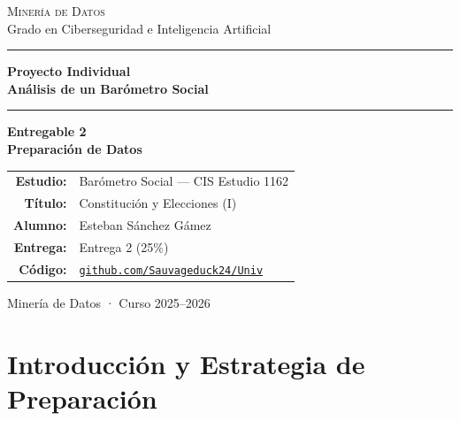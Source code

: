 \documentclass[12pt,a4paper]{article}
\begin{document}
\begin{titlepage}
  \centering
  \vspace*{2cm}

  {\large\color{gray}\textsc{Minería de Datos}\\
  Grado en Ciberseguridad e Inteligencia Artificial}

  \vspace{1.5cm}
  {\color{primary}\rule{\linewidth}{1.5pt}}
  \vspace{0.4cm}

  {\Huge\bfseries\color{black} Proyecto Individual\\[0.3em]
  \Large Análisis de un Barómetro Social}

  \vspace{0.4cm}
  {\color{primary}\rule{\linewidth}{1.5pt}}

  \vspace{1cm}
  {\LARGE\bfseries\color{black}
  Entregable 2\\[0.2em]
  \large Preparación de Datos}

  \vspace{2cm}
  \begin{tabular}{rl}
    \textbf{Estudio:}    & Barómetro Social --- CIS Estudio 1162 \\[4pt]
    \textbf{Título:}     & Constitución y Elecciones (I) \\[4pt]
    \textbf{Alumno:}     & Esteban Sánchez Gámez \\[4pt]
    \textbf{Entrega:}    & Entrega 2 (25\%) \\[4pt]
    \textbf{Código:}     & \href{https://github.com/Sauvageduck24/Univ/tree/main/mineria_de_datos}{\texttt{github.com/Sauvageduck24/Univ}} \\[4pt]
  \end{tabular}

  \vfill
  {\small\color{gray}Minería de Datos · Curso 2025--2026}
\end{titlepage}

\tableofcontents
\newpage

\section{Introducción y Estrategia de Preparación}
\end{document}
